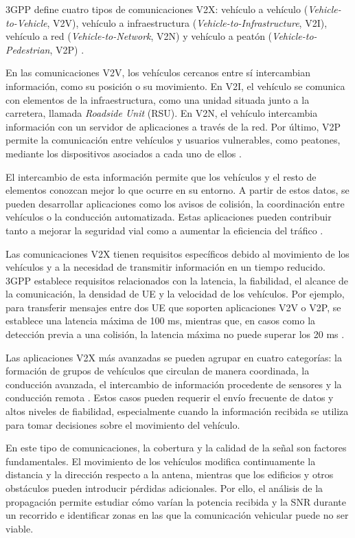 3GPP define cuatro tipos de comunicaciones V2X: vehículo a vehículo (\textit{Vehicle-to-Vehicle}, V2V), vehículo a infraestructura (\textit{Vehicle-to-Infrastructure}, V2I), vehículo a red (\textit{Vehicle-to-Network}, V2N) y vehículo a peatón (\textit{Vehicle-to-Pedestrian}, V2P) \cite{etsi122185}.

En las comunicaciones V2V, los vehículos cercanos entre sí intercambian información, como su posición o su movimiento. En V2I, el vehículo se comunica con elementos de la infraestructura, como una unidad situada junto a la carretera, llamada \textit{Roadside Unit} (RSU). En V2N, el vehículo intercambia información con un servidor de aplicaciones a través de la red. Por último, V2P permite la comunicación entre vehículos y usuarios vulnerables, como peatones, mediante los dispositivos asociados a cada uno de ellos \cite{etsi122185}.

El intercambio de esta información permite que los vehículos y el resto de elementos conozcan mejor lo que ocurre en su entorno. A partir de estos datos, se pueden desarrollar aplicaciones como los avisos de colisión, la coordinación entre vehículos o la conducción automatizada. Estas aplicaciones pueden contribuir tanto a mejorar la seguridad vial como a aumentar la eficiencia del tráfico \cite{etsi122185}.

Las comunicaciones V2X tienen requisitos específicos debido al movimiento de los vehículos y a la necesidad de transmitir información en un tiempo reducido. 3GPP establece requisitos relacionados con la latencia, la fiabilidad, el alcance de la comunicación, la densidad de UE y la velocidad de los vehículos. Por ejemplo, para transferir mensajes entre dos UE que soporten aplicaciones V2V o V2P, se establece una latencia máxima de 100 ms, mientras que, en casos como la detección previa a una colisión, la latencia máxima no puede superar los 20 ms \cite{etsi122185}.

Las aplicaciones V2X más avanzadas se pueden agrupar en cuatro categorías: la formación de grupos de vehículos que circulan de manera coordinada, la conducción avanzada, el intercambio de información procedente de sensores y la conducción remota \cite{etsi122186}. Estos casos pueden requerir el envío frecuente de datos y altos niveles de fiabilidad, especialmente cuando la información recibida se utiliza para tomar decisiones sobre el movimiento del vehículo.

En este tipo de comunicaciones, la cobertura y la calidad de la señal son factores fundamentales. El movimiento de los vehículos modifica continuamente la distancia y la dirección respecto a la antena, mientras que los edificios y otros obstáculos pueden introducir pérdidas adicionales. Por ello, el análisis de la propagación permite estudiar cómo varían la potencia recibida y la SNR durante un recorrido e identificar zonas en las que la comunicación vehicular puede no ser viable.


